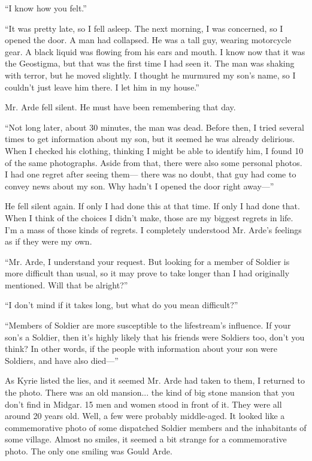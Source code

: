 \documentclass[oneside]{book}
\begin{document}
“I know how you felt.”

“It was pretty late, so I fell asleep. The next morning, I was concerned, so I opened the door. A man had collapsed. He was a tall guy, wearing motorcycle gear. A black liquid was flowing from his ears and mouth. I know now that it was the Geostigma, but that was the first time I had seen it. The man was shaking with terror, but he moved slightly. I thought he murmured my son’s name, so I couldn’t just leave him there. I let him in my house.”

Mr. Arde fell silent. He must have been remembering that day.

“Not long later, about 30 minutes, the man was dead. Before then, I tried several times to get information about my son, but it seemed he was already delirious. When I checked his clothing, thinking I might be able to identify him, I found 10 of the same photographs. Aside from that, there were also some personal photos. I had one regret after seeing them— there was no doubt, that guy had come to convey news about my son. Why hadn’t I opened the door right away—”

He fell silent again. If only I had done this at that time. If only I had done that. When I think of the choices I didn’t make, those are my biggest regrets in life. I’m a mass of those kinds of regrets. I completely understood Mr. Arde’s feelings as if they were my own.

“Mr. Arde, I understand your request. But looking for a member of Soldier is more difficult than usual, so it may prove to take longer than I had originally mentioned. Will that be alright?”

“I don’t mind if it takes long, but what do you mean difficult?”

“Members of Soldier are more susceptible to the lifestream’s influence. If your son’s a Soldier, then it’s highly likely that his friends were Soldiers too, don’t you think? In other words, if the people with information about your son were Soldiers, and have also died—”

As Kyrie listed the lies, and it seemed Mr. Arde had taken to them, I returned to the photo. There was an old mansion... the kind of big stone mansion that you don’t find in Midgar. 15 men and women stood in front of it. They were all around 20 years old. Well, a few were probably middle-aged. It looked like a commemorative photo of some dispatched Soldier members and the inhabitants of some village. Almost no smiles, it seemed a bit strange for a commemorative photo. The only one smiling was Gould Arde.
\end{document}
